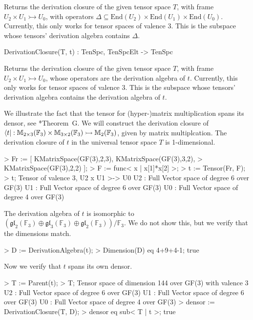 Returns the derivation closure of the given tensor space $T$, with frame $U_2\times U_1\rightarrowtail U_0$, with operators $\Delta\subseteq \text{End}(U_2)\times \text{End}(U_1)\times \text{End}(U_0)$.
Currently, this only works for tensor spaces of valence 3.
This is the subspace whose tensors' derivation algebra contains $\Delta$.

\begin{intrinsics}
DerivationClosure(T, t) : TenSpc, TenSpcElt -> TenSpc
\end{intrinsics}

Returns the derivation closure of the given tensor space $T$, with frame $U_2\times U_1\rightarrowtail U_0$, whose operators are the derivation algebra of $t$. 
Currently, this only works for tensor spaces of valence 3.
This is the subspace whose tensors' derivation algebra contains the derivation algebra of $t$.

\begin{example}

We illustrate the fact that the tensor for (hyper-)matrix multiplication spans its densor, see \cite{FMW:densors}*{Theorem~G}.
We will construct the derivation closure of $\langle t|:\mathbb{M}_{2\times 3}(\mathbb{F}_3)\times \mathbb{M}_{3\times 2}(\mathbb{F}_3)\rightarrowtail \mathbb{M}_{2}(\mathbb{F}_3)$, given by matrix multiplcation. 
The derivation closure of $t$ in the universal tensor space $T$ is 1-dimensional.
\begin{code}
> Fr := [ KMatrixSpace(GF(3),2,3), KMatrixSpace(GF(3),3,2),
>     KMatrixSpace(GF(3),2,2) ];
> F := func< x | x[1]*x[2] >;
> t := Tensor(Fr, F);
> t;
Tensor of valence 3, U2 x U1 >-> U0
U2 : Full Vector space of degree 6 over GF(3)
U1 : Full Vector space of degree 6 over GF(3)
U0 : Full Vector space of degree 4 over GF(3)
\end{code}

The derivation algebra of $t$ is isomorphic to $(\mathfrak{gl}_2(\mathbb{F}_3)\oplus \mathfrak{gl}_3(\mathbb{F}_3)\oplus \mathfrak{gl}_2(\mathbb{F}_3))/\mathbb{F}_3$.
We do not show this, but we verify that the dimensions match.
\begin{code}
> D := DerivationAlgebra(t);
> Dimension(D) eq 4+9+4-1;
true
\end{code}

Now we verify that $t$ spans its own densor.
\begin{code}
> T := Parent(t);
> T;
Tensor space of dimension 144 over GF(3) with valence 3
U2 : Full Vector space of degree 6 over GF(3)
U1 : Full Vector space of degree 6 over GF(3)
U0 : Full Vector space of degree 4 over GF(3)
> densor := DerivationClosure(T, D);
> densor eq sub< T | t >;
true
\end{code}
\end{example}


